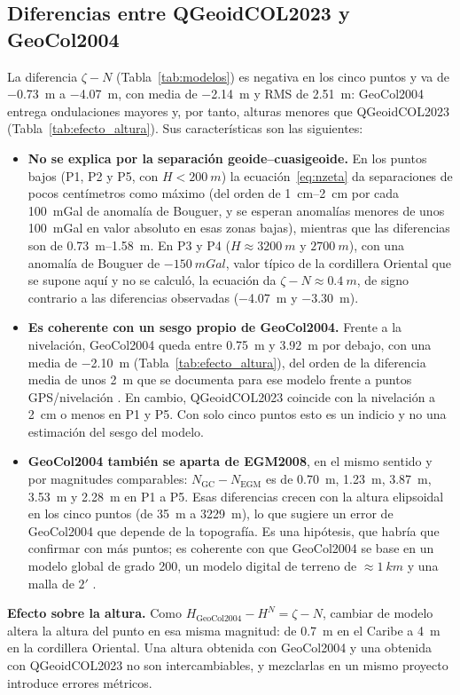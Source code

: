 \documentclass[11pt,letterpaper]{article}
\begin{document}
\subsection{Diferencias entre QGeoidCOL2023 y GeoCol2004}
\label{sec:analisis_modelos}
La diferencia $\zeta-N$ (Tabla~\ref{tab:modelos}) es negativa en los cinco puntos y va de
\SI{-0.73}{m} a \SI{-4.07}{m}, con media de \SI{-2.14}{m} y RMS de \SI{2.51}{m}: GeoCol2004 entrega
ondulaciones mayores y, por tanto, alturas menores que QGeoidCOL2023 (Tabla~\ref{tab:efecto_altura}). Sus
características son las siguientes:
\begin{itemize}
    \item \textbf{No se explica por la separación geoide--cuasigeoide.} En los puntos bajos (P1, P2 y
    P5, con $H<\SI{200}{m}$) la ecuación~\eqref{eq:nzeta} da separaciones de pocos centímetros como
    máximo (del orden de \SIrange{1}{2}{cm} por cada \SI{100}{mGal} de anomalía de Bouguer, y
    se esperan anomalías menores de unos \SI{100}{mGal} en valor absoluto en esas zonas bajas),
    mientras que las diferencias son de \SIrange{0.73}{1.58}{m}. En P3 y P4 ($H\approx\SI{3200}{m}$ y
    $\SI{2700}{m}$), con una anomalía de Bouguer de $-\SI{150}{mGal}$, valor típico de la cordillera
    Oriental que se supone aquí y no se calculó, la ecuación da $\zeta-N\approx\SI{+0.4}{m}$, de signo
    contrario a las diferencias observadas (\SI{-4.07}{m} y \SI{-3.30}{m}).
    \item \textbf{Es coherente con un sesgo propio de GeoCol2004.} Frente a la nivelación, GeoCol2004 queda entre
    \SI{0.75}{m} y \SI{3.92}{m} por debajo, con una media de \SI{-2.10}{m}
    (Tabla~\ref{tab:efecto_altura}), del orden de la diferencia media de unos \SI{2}{m} que se
    documenta para ese modelo frente a puntos GPS/nivelación \citep{isg,sanchez2003}. En cambio, QGeoidCOL2023 coincide con la
    nivelación a \SI{2}{cm} o menos en P1 y P5. Con solo cinco puntos esto es un indicio y no una
    estimación del sesgo del modelo.
    \item \textbf{GeoCol2004 también se aparta de EGM2008}, en el mismo sentido y por magnitudes
    comparables: $N_{\text{GC}}-N_{\text{EGM}}$ es de \SI{+0.70}{m}, \SI{+1.23}{m}, \SI{+3.87}{m},
    \SI{+3.53}{m} y \SI{+2.28}{m} en P1 a P5. Esas diferencias crecen con la altura elipsoidal en los
    cinco puntos (de \SI{35}{m} a \SI{3229}{m}), lo que sugiere un error de GeoCol2004 que depende de la
    topografía. Es una hipótesis, que habría que confirmar con más puntos; es coherente con que
    GeoCol2004 se base en un modelo global de grado 200, un modelo digital de terreno de
    $\approx\SI{1}{km}$ y una malla de $2'$ \citep{isg}.
\end{itemize}
\noindent\textbf{Efecto sobre la altura.} Como $H_{\text{GeoCol2004}}-H^N=\zeta-N$,
cambiar de modelo altera la altura del punto en esa misma magnitud: de \SI{0.7}{m} en el Caribe a
\SI{4}{m} en la cordillera Oriental. Una altura obtenida con GeoCol2004 y una obtenida con
QGeoidCOL2023 no son intercambiables, y mezclarlas en un mismo proyecto introduce errores
métricos.
\end{document}
